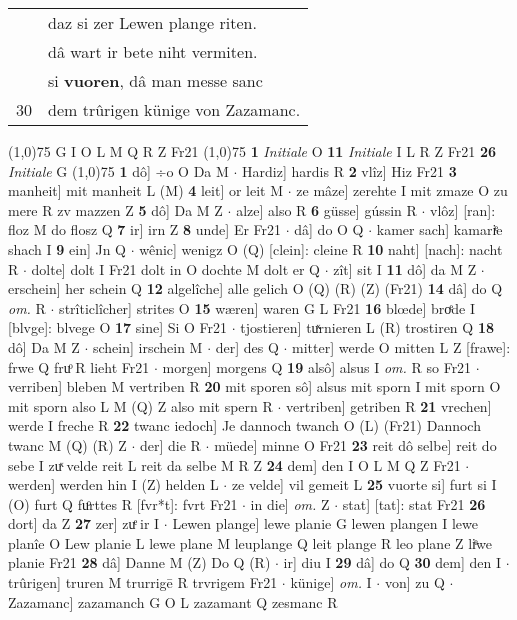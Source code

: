 \documentclass[8pt,a4paper,notitlepage]{article}
\begin{document}
\begin{table}[ht]
\begin{minipage}[t]{0.5\linewidth}
\begin{tabular}{rl}
 & daz si zer Lewen plange riten.\\ 
 & dâ wart ir bete niht vermiten.\\ 
 & si \textbf{vuoren}, dâ man messe sanc\\ 
30 & dem trûrigen künige von Zazamanc.\\ 
\end{tabular}
\scriptsize
\line(1,0){75} \newline
G I O L M Q R Z Fr21 \newline
\line(1,0){75} \newline
\textbf{1} \textit{Initiale} O  \textbf{11} \textit{Initiale} I L R Z Fr21  \textbf{26} \textit{Initiale} G  \newline
\line(1,0){75} \newline
\textbf{1} dô] ÷o O Da M  $\cdot$ Hardiz] hardis R \textbf{2} vlîz] Hiz Fr21 \textbf{3} manheit] mit manheit L (M) \textbf{4} leit] or leit M  $\cdot$ ze mâze] zerehte I mit zmaze O zu mere R zv mazzen Z \textbf{5} dô] Da M Z  $\cdot$ alze] also R \textbf{6} güsse] gússin R  $\cdot$ vlôz] [ran]: floz M do flosz Q \textbf{7} ir] irn Z \textbf{8} unde] Er Fr21  $\cdot$ dâ] do O Q  $\cdot$ kamer sach] kamariͤe shach I \textbf{9} ein] Jn Q  $\cdot$ wênic] wenigz O (Q) [clein]: cleine  R \textbf{10} naht] [nach]: nacht R  $\cdot$ dolte] dolt I Fr21 dolt in O dochte M dolt er Q  $\cdot$ zît] sit I \textbf{11} dô] da M Z  $\cdot$ erschein] her schein Q \textbf{12} algelîche] alle gelich O (Q) (R) (Z) (Fr21) \textbf{14} dâ] do Q \textit{om.} R  $\cdot$ strîticlîcher] strites O \textbf{15} wæren] waren G L Fr21 \textbf{16} blœde] broͤde I [blvge]: blvege O \textbf{17} sine] Si O Fr21  $\cdot$ tjostieren] tuͯrnieren L (R) trostiren Q \textbf{18} dô] Da M Z  $\cdot$ schein] irschein M  $\cdot$ der] des Q  $\cdot$ mitter] werde O mitten L Z [frawe]: frwe Q fruͦ R lieht Fr21  $\cdot$ morgen] morgens Q \textbf{19} alsô] alsus I \textit{om.} R so Fr21  $\cdot$ verriben] bleben M vertriben R \textbf{20} mit sporen sô] alsus mit sporn I mit sporn O mit sporn also L M (Q) Z also mit spern R  $\cdot$ vertriben] getriben R \textbf{21} vrechen] werde I freche R \textbf{22} twanc iedoch] Je dannoch twanch O (L) (Fr21) Dannoch twanc M (Q) (R) Z  $\cdot$ der] die R  $\cdot$ müede] minne O Fr21 \textbf{23} reit dô selbe] reit do sebe I zuͯ velde reit L reit da selbe M R Z \textbf{24} dem] den I O L M Q Z Fr21  $\cdot$ werden] werden hin I (Z) helden L  $\cdot$ ze velde] vil gemeit L \textbf{25} vuorte si] furt si I (O) furt Q fuͦrttes R [fvr*t]: fvrt Fr21  $\cdot$ in die] \textit{om.} Z  $\cdot$ stat] [tat]: stat Fr21 \textbf{26} dort] da Z \textbf{27} zer] zuͤ ir I  $\cdot$ Lewen plange] lewe planie G lewen plangen I lewe planîe O Lew planie L lewe plane M leuplange Q leit plange R leo plane Z liͤwe planie Fr21 \textbf{28} dâ] Danne M (Z) Do Q (R)  $\cdot$ ir] diu I \textbf{29} dâ] do Q \textbf{30} dem] den I  $\cdot$ trûrigen] truren M trurrigē R trvrigem Fr21  $\cdot$ künige] \textit{om.} I  $\cdot$ von] zu Q  $\cdot$ Zazamanc] zazamanch G O L zazamant Q zesmanc R \newline

\end{minipage}
\end{table}
\end{document}

